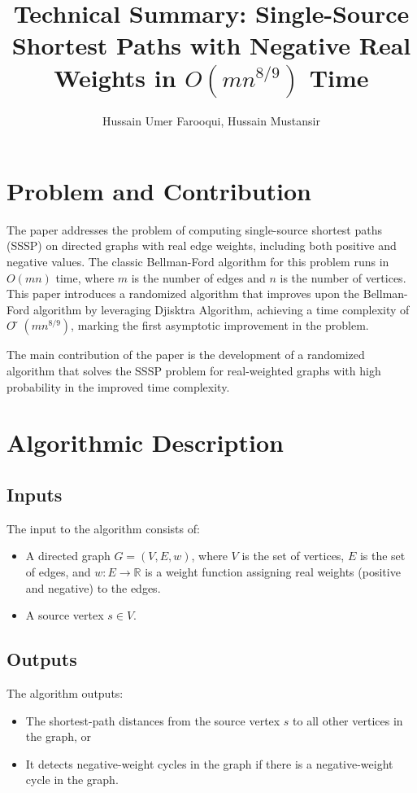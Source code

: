 \documentclass[12pt]{article}
\title{Technical Summary: Single-Source Shortest Paths with Negative Real Weights in \(O(mn^{8/9})\) Time}
\author{Hussain Umer Farooqui, Hussain Mustansir}
\begin{document}
\maketitle

\section*{Problem and Contribution}
The paper addresses the problem of computing single-source shortest paths (SSSP) on directed graphs with real edge weights, including both positive and negative values. The classic Bellman-Ford algorithm for this problem runs in \(O(mn)\) time, where \(m\) is the number of edges and \(n\) is the number of vertices. This paper introduces a randomized algorithm that improves upon the Bellman-Ford algorithm by leveraging Djisktra Algorithm, achieving a time complexity of \(Õ(mn^{8/9})\), marking the first asymptotic improvement in the problem.

The main contribution of the paper is the development of a randomized algorithm that solves the SSSP problem for real-weighted graphs with high probability in the improved time complexity.

\section*{Algorithmic Description}

\subsection*{Inputs}
The input to the algorithm consists of:
\begin{itemize}
    \item A directed graph \( G = (V, E, w) \), where \( V \) is the set of vertices, \( E \) is the set of edges, and \( w : E \to \mathbb{R} \) is a weight function assigning real weights (positive and negative) to the edges.
    \item A source vertex \( s \in V \).
\end{itemize}

\subsection*{Outputs}
The algorithm outputs:
\begin{itemize}
    \item The shortest-path distances from the source vertex \( s \) to all other vertices in the graph, or
    \item It detects negative-weight cycles in the graph if there is a negative-weight cycle in the graph.
\end{itemize}
\end{document}
